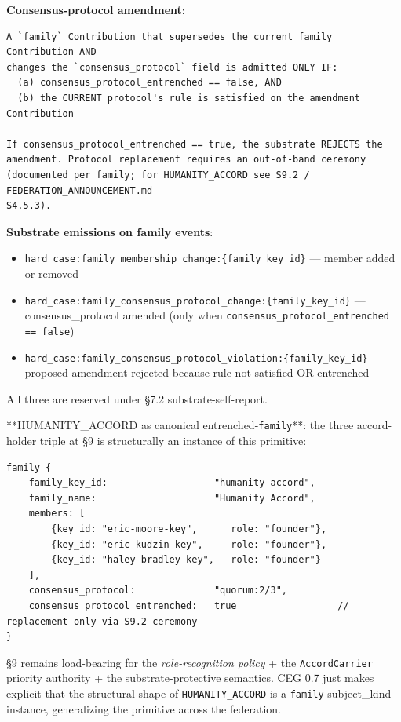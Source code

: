 \documentclass[11pt]{article}
\begin{document}
\textbf{Consensus-protocol amendment}:


\begin{lstlisting}
A `family` Contribution that supersedes the current family Contribution AND
changes the `consensus_protocol` field is admitted ONLY IF:
  (a) consensus_protocol_entrenched == false, AND
  (b) the CURRENT protocol's rule is satisfied on the amendment Contribution

If consensus_protocol_entrenched == true, the substrate REJECTS the
amendment. Protocol replacement requires an out-of-band ceremony
(documented per family; for HUMANITY_ACCORD see S9.2 / FEDERATION_ANNOUNCEMENT.md
S4.5.3).
\end{lstlisting}

\textbf{Substrate emissions on family events}:

\begin{itemize}\setlength\itemsep{0pt}
\item \texttt{hard\_case:family\_membership\_change:\{family\_key\_id\}} — member added or removed
\item \texttt{hard\_case:family\_consensus\_protocol\_change:\{family\_key\_id\}} — consensus\_protocol amended (only when \texttt{consensus\_protocol\_entrenched == false})
\item \texttt{hard\_case:family\_consensus\_protocol\_violation:\{family\_key\_id\}} — proposed amendment rejected because rule not satisfied OR entrenched
\end{itemize}


All three are reserved under §7.2 substrate-self-report.


**HUMANITY\_ACCORD as canonical entrenched-\texttt{family}**: the three accord-holder triple at §9 is structurally an instance of this primitive:


\begin{lstlisting}
family {
    family_key_id:                   "humanity-accord",
    family_name:                     "Humanity Accord",
    members: [
        {key_id: "eric-moore-key",      role: "founder"},
        {key_id: "eric-kudzin-key",     role: "founder"},
        {key_id: "haley-bradley-key",   role: "founder"}
    ],
    consensus_protocol:              "quorum:2/3",
    consensus_protocol_entrenched:   true                  // replacement only via S9.2 ceremony
}
\end{lstlisting}

§9 remains load-bearing for the \textit{role-recognition policy} + the \texttt{AccordCarrier} priority authority + the substrate-protective semantics. CEG 0.7 just makes explicit that the structural shape of \texttt{HUMANITY\_ACCORD} is a \texttt{family} subject\_kind instance, generalizing the primitive across the federation.
\end{document}

